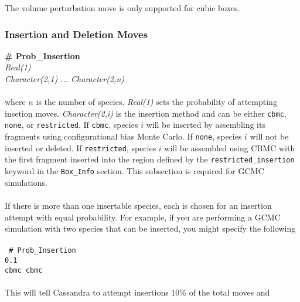 The volume perturbation move is only supported for cubic boxes.
%
%





%
%
\subsubsection{Insertion and Deletion Moves}
{\bf \# Prob\_Insertion} \\
{\it Real(1)} \\
{\it Character(2,1) ... Character(2,n)} \\ \\
%
where $n$ is the number of species.
{\it Real(1)} sets the probability of attempting insetion moves.
{\it Character(2,i)} is the insertion method and can be either
\texttt{cbmc}, \texttt{none}, or \texttt{restricted}.
If \texttt{cbmc}, species $i$ will be inserted by assembling its
fragments using configurational bias Monte Carlo.
If \texttt{none}, species $i$ will not be inserted or deleted.
If \texttt{restricted}, species $i$ will be assembled using CBMC
with the first fragment inserted into the region defined by
the \texttt{restricted\_insertion} keyword in the \texttt{Box\_Info} section.
This subsection is required for GCMC simulations. \\ \\
%
If there is more than one insertable species, each is chosen for an insertion attempt with equal probability.
For example, if you are performing a GCMC simulation with two species that can
be inserted, you might specify the following \\ \\
%
\texttt{
\# Prob\_Insertion \\
0.1 \\
cbmc cbmc} \\ \\
%
This will tell Cassandra to attempt insertions 10\% of the total moves and
